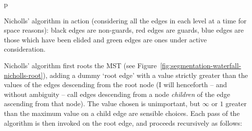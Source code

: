 \begin{stusubfig}{p}
	\hspace{4mm}%
	\hspace{4mm}%
\caption{Nicholls' algorithm in action (considering all the edges in each level at a time for space reasons): black edges are non-guards, red edges are guards, blue edges are those which have been elided and green edges are ones under active consideration.}
\label{fig:segmentation-waterfall-nicholls-example}
\end{stusubfig}

Nicholls' algorithm first roots the MST (see Figure~\ref{fig:segmentation-waterfall-nicholls-root}), adding a dummy `root edge' with a value strictly greater than the values of the edges descending from the root node (I will henceforth -- and without ambiguity -- call edges descending from a node \emph{children} of the edge ascending from that node). The value chosen is unimportant, but $\infty$ or $1$ greater than the maximum value on a child edge are sensible choices. Each pass of the algorithm is then invoked on the root edge, and proceeds recursively as follows:

